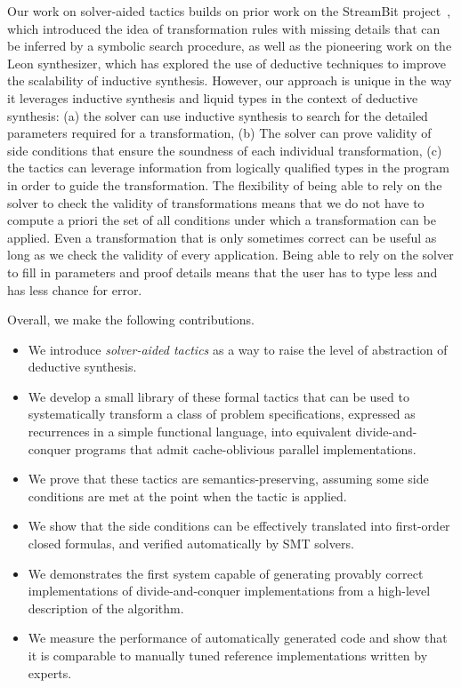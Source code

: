 Our work on solver-aided tactics builds on prior work on the StreamBit project~\cite{PLDI05/Solar-Lezama}, which
introduced the idea of transformation rules with missing details that can be inferred by a symbolic search procedure, as
well as the pioneering work on the Leon synthesizer, which has explored the use of deductive techniques to improve the
scalability of inductive synthesis. However, our approach is unique in the way it leverages inductive synthesis and
liquid types in the context of deductive synthesis: 
(a) the solver can use inductive synthesis to search for the detailed parameters required for a transformation,
(b) The solver can prove validity of side conditions that ensure the soundness of each individual transformation, 
(c) the tactics can leverage information from logically qualified types in the program in
    order to guide the transformation. 
The flexibility of being able to rely on the solver to check the validity of
transformations means that we do not have to compute a priori the set of all conditions under which a transformation can
be applied. Even a transformation that is only sometimes correct can be useful as long as we check the validity of every
application. Being able to rely on the solver to fill in parameters and proof details means
that the user has to type less and has less chance for error.


Overall, we make the following contributions.
\begin{itemize}
\item We introduce \emph{solver-aided tactics} as a way to raise the level of abstraction of deductive synthesis.
\item We develop a small library of these formal tactics that can be used to 
  systematically transform a class of problem specifications,
  expressed as recurrences in a simple functional language,
  into equivalent divide-and-conquer programs that admit cache-oblivious parallel
  implementations.
\item We prove that these tactics are semantics-preserving, assuming some side conditions are met
  at the point when the tactic is applied.
\item We show that the side conditions can be effectively translated into first-order closed
  formulas, and verified automatically by SMT solvers.
\item We demonstrates the first system capable of generating provably correct implementations of divide-and-conquer implementations from a high-level description of the algorithm. 
\item We measure the performance of automatically generated code and show that it is
  comparable to manually tuned reference implementations written by experts.
\end{itemize}

